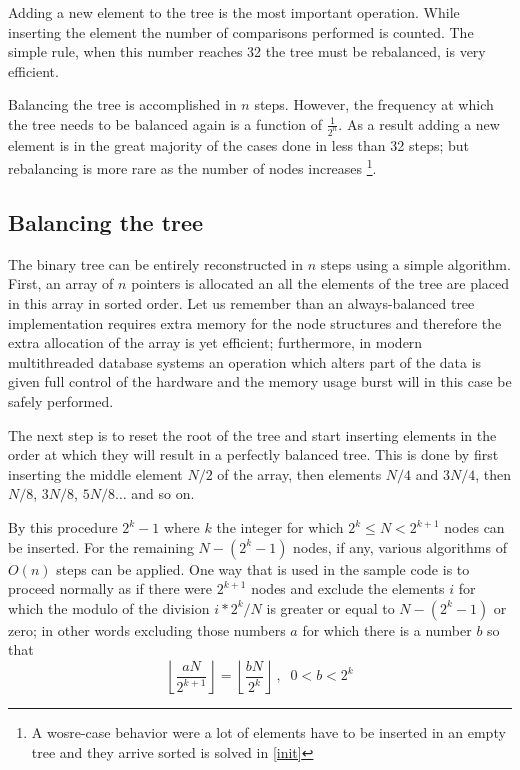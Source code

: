 \documentclass[twocolumn]{article}
\begin{document}
Adding a new element to the tree is the most important operation. While
inserting the element the number of comparisons performed is counted. The
simple rule, when this number reaches 32 the tree must be rebalanced, is
very efficient.

Balancing the tree is accomplished in $n$ steps. However, the frequency at
which the tree needs to be balanced again is a function of $\frac{1}{2^n}$.
As a result adding a new element is in the great majority of the cases done
in less than 32 steps; but rebalancing is more rare as the number of nodes
increases
\footnote{A wosre-case behavior were a lot of elements have to be inserted
in an empty tree and they arrive sorted is solved in \ref{init}}.

\subsection{Balancing the tree}

The binary tree can be entirely reconstructed in $n$ steps using a simple
algorithm. First, an array of $n$ pointers is allocated an all the elements
of the tree are placed in this array in sorted order. Let us remember than an
always-balanced tree implementation requires extra memory for the node
structures and therefore the extra allocation of the array is yet efficient;
furthermore, in modern multithreaded database systems an operation which
alters part of the data is given full control of the hardware and the memory
usage burst will in this case be safely performed.

The next step is to reset the root of the tree and start inserting elements
in the order at which they will result in a perfectly balanced tree. This is
done by first inserting the middle element $N/2$ of the array, then
elements $N/4$ and $3 N / 4$, then $N/8$, $3 N / 8$, $5 N / 8 \ldots$
and so on.

By this procedure $2^k - 1$ where $k$ the integer for which
$2^k \leq N < 2^{k + 1}$ nodes can be inserted. For the remaining $N-(2^k -1)$
nodes, if any, various algorithms of $O(n)$ steps can be applied. One way
that is used in the sample code is to proceed normally as if there were
$2^{k+1}$ nodes and exclude the elements $i$ for which the modulo of the
division $i * 2^k / N$ is greater or equal to $N-(2^k -1)$ or zero; in other
words excluding those numbers $a$ for which there is a number $b$ so that
\begin{equation}
\left\lfloor \frac{a N}{2^{k+1}} \right\rfloor =
\left\lfloor \frac{b N}{2^k} \right\rfloor
\: , \;\; 0 < b < 2^k
\end{equation}
\end{document}
